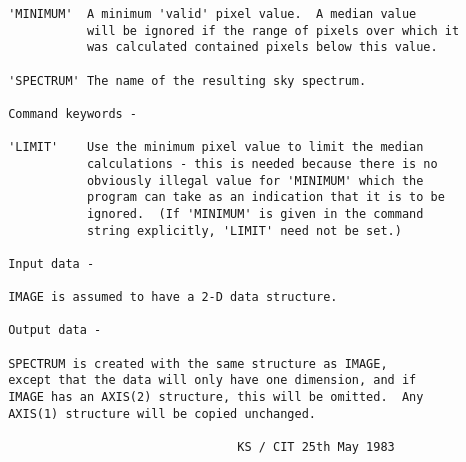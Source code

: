\begin{description}
\begin{verbatim}
 'MINIMUM'  A minimum 'valid' pixel value.  A median value
            will be ignored if the range of pixels over which it
            was calculated contained pixels below this value.

 'SPECTRUM' The name of the resulting sky spectrum.

 Command keywords -

 'LIMIT'    Use the minimum pixel value to limit the median
            calculations - this is needed because there is no
            obviously illegal value for 'MINIMUM' which the
            program can take as an indication that it is to be
            ignored.  (If 'MINIMUM' is given in the command
            string explicitly, 'LIMIT' need not be set.)

 Input data -

 IMAGE is assumed to have a 2-D data structure.

 Output data -

 SPECTRUM is created with the same structure as IMAGE,
 except that the data will only have one dimension, and if
 IMAGE has an AXIS(2) structure, this will be omitted.  Any
 AXIS(1) structure will be copied unchanged.

                                 KS / CIT 25th May 1983
\end{verbatim}
\end{description}
